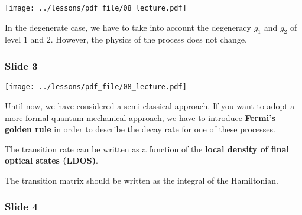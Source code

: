 \documentclass[../main/main.tex]{subfiles}
\begin{document}
\begin{minipage}[]{0.5\linewidth}
\centering
\texttt{[image: ../lessons/pdf\_file/08\_lecture.pdf]}
\end{minipage}
\hspace{0.3cm}
\vspace{0.3cm}
\begin{minipage}[c]{0.47\linewidth}

In the degenerate case, we have to take into account the degeneracy \( g_1 \) and \( g_2 \) of level 1 and 2.
However, the physics of the process does not change.

\end{minipage}

\subsubsection*{Slide 3}

\begin{minipage}[]{0.5\linewidth}
\centering
\texttt{[image: ../lessons/pdf\_file/08\_lecture.pdf]}
\end{minipage}
\hspace{0.3cm}
\vspace{0.3cm}
\begin{minipage}[c]{0.47\linewidth}

Until now, we have considered a semi-classical approach. If you want to adopt a more formal quantum mechanical approach, we have to introduce \textbf{Fermi's golden rule} in order to describe the decay rate for one of these processes.

The transition rate can be written as a function of the \textbf{local density of final optical states (LDOS)}.

The transition matrix should be written as the integral of the Hamiltonian.

\end{minipage}

\newpage

\subsubsection*{Slide 4}
\end{document}
